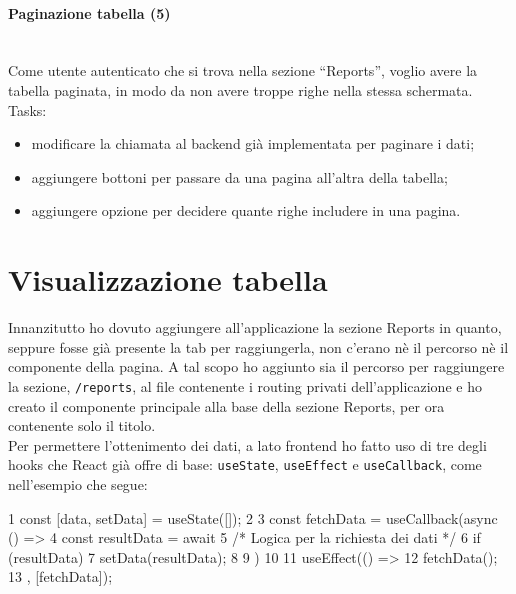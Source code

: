 \paragraph{Paginazione tabella (5)}\mbox{} \\[\baselineskip]
\noindent Come utente autenticato che si trova nella sezione “Reports”, voglio avere la tabella paginata, in modo da non avere troppe righe nella stessa schermata. \\

\noindent Tasks:

\begin{itemize}
  \item modificare la chiamata al backend già implementata per paginare i dati;
  \item aggiungere bottoni per passare da una pagina all'altra della tabella;
  \item aggiungere opzione per decidere quante righe includere in una pagina.
\end{itemize}

\section{Visualizzazione tabella}
\noindent Innanzitutto ho dovuto aggiungere all'applicazione la sezione Reports in quanto, seppure fosse già presente la tab per raggiungerla, non c'erano nè il percorso nè il componente della pagina.
A tal scopo ho aggiunto sia il percorso per raggiungere la sezione, \texttt{/reports}, al file contenente i routing privati dell'applicazione e ho creato il componente principale alla base della sezione Reports, per ora contenente solo il titolo.\\
Per permettere l'ottenimento dei dati, a lato frontend ho fatto uso di tre degli hooks che React già offre di base: \texttt{useState}, \texttt{useEffect} e \texttt{useCallback}, come nell'esempio che segue: \\
\begin{code}[frame=tb,title={Esempio di fetch dati da backend e memorizzazione in React state}]
1   const [data, setData] = useState([]);
2 
3   const fetchData = useCallback(async () => {
4     const resultData = await
5     /* Logica per la richiesta dei dati */
6     if (resultData) {
7       setData(resultData);
8     }
9    })
10
11  useEffect(() => {
12    fetchData();
13  }, [fetchData]);
\end{code}\\\\


